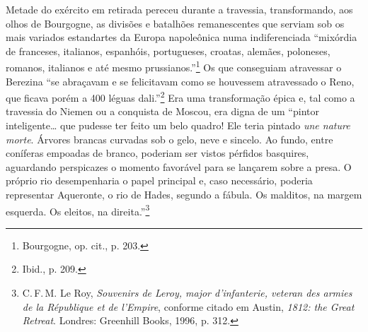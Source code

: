 Metade do exército em retirada pereceu durante a travessia,
transformando, aos olhos de Bourgogne, as divisões e batalhões
remanescentes que serviam sob os mais variados estandartes da Europa
napoleônica numa indiferenciada ``mixórdia de franceses, italianos,
espanhóis, portugueses, croatas, alemães, poloneses, romanos, italianos
e até mesmo prussianos.''\footnote{Bourgogne, op. cit., p. 203.} Os que
conseguiam atravessar o Berezina ``se abraçavam e se felicitavam como se
houvessem atravessado o Reno, que ficava porém a 400 léguas
dali.''\footnote{Ibid., p. 209.} Era uma transformação épica e, tal como
a travessia do Niemen ou a conquista de Moscou, era digna de um ``pintor
inteligente\ldots{} que pudesse ter feito um belo quadro! Ele teria
pintado \textit{une nature morte}. Árvores brancas curvadas sob o gelo,
neve e sincelo. Ao fundo, entre coníferas empoadas de branco, poderiam
ser vistos pérfidos basquires, aguardando perspicazes o momento
favorável para se lançarem sobre a presa. O próprio rio desempenharia o
papel principal e, caso necessário, poderia representar Aqueronte, o rio
de Hades, segundo a fábula. Os malditos, na margem esquerda. Os eleitos,
na direita.''\footnote{C.\,F.\,M. Le Roy, \textit{Souvenirs de Leroy, major d'infanterie, veteran des armies de la République et de l'Empire}, conforme citado em Austin, \textit{1812: the Great Retreat}. Londres: Greenhill Books, 1996, p. 312.}

